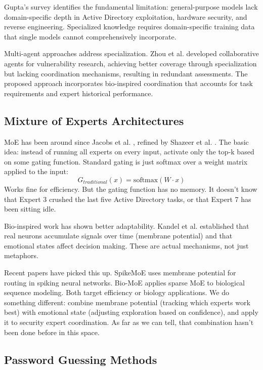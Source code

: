 \documentclass[preprint,12pt]{elsarticle}
\begin{document}
Gupta's survey \cite{gupta2024} identifies the fundamental limitation: general-purpose models lack domain-specific depth in Active Directory exploitation, hardware security, and reverse engineering. Specialized knowledge requires domain-specific training data that single models cannot comprehensively incorporate.

Multi-agent approaches address specialization. Zhou et al. \cite{zhou2023} developed collaborative agents for vulnerability research, achieving better coverage through specialization but lacking coordination mechanisms, resulting in redundant assessments. The proposed approach incorporates bio-inspired coordination that accounts for task requirements and expert historical performance.

\subsection{Mixture of Experts Architectures}

MoE has been around since Jacobs et al. \cite{jacobs1991}, refined by Shazeer et al. \cite{shazeer2017}. The basic idea: instead of running all experts on every input, activate only the top-k based on some gating function. Standard gating is just softmax over a weight matrix applied to the input:
\begin{equation}
G_{traditional}(x) = \text{softmax}(W \cdot x)
\end{equation}
Works fine for efficiency. But the gating function has no memory. It doesn't know that Expert 3 crushed the last five Active Directory tasks, or that Expert 7 has been sitting idle.

Bio-inspired work has shown better adaptability. Kandel et al. \cite{kandel2013} established that real neurons accumulate signals over time (membrane potential) and that emotional states affect decision making. These are actual mechanisms, not just metaphors.

Recent papers have picked this up. SpikeMoE \cite{spikemoe2024} uses membrane potential for routing in spiking neural networks. Bio-MoE \cite{biomoe2024} applies sparse MoE to biological sequence modeling. Both target efficiency or biology applications. We do something different: combine membrane potential (tracking which experts work best) with emotional state (adjusting exploration based on confidence), and apply it to security expert coordination. As far as we can tell, that combination hasn't been done before in this space.

\subsection{Password Guessing Methods}
\end{document}
